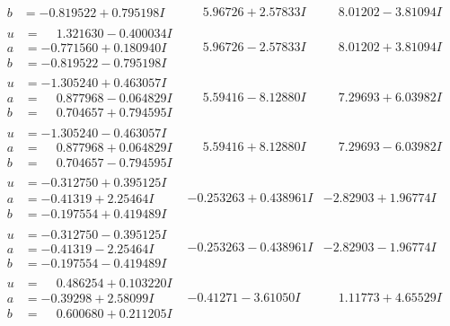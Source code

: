 \documentclass[1p]{elsarticle_modified}
\theoremstyle{definition}
\begin{document}
$$\begin{array}{c|c|c}
\begin{aligned}
b &= -0.819522 + 0.795198 I\end{aligned}
 & \phantom{-}5.96726 + 2.57833 I & \phantom{-}8.01202 - 3.81094 I \\ \hline\begin{aligned}
u &= \phantom{-}1.321630 - 0.400034 I \\
a &= -0.771560 + 0.180940 I \\
b &= -0.819522 - 0.795198 I\end{aligned}
 & \phantom{-}5.96726 - 2.57833 I & \phantom{-}8.01202 + 3.81094 I \\ \hline\begin{aligned}
u &= -1.305240 + 0.463057 I \\
a &= \phantom{-}0.877968 - 0.064829 I \\
b &= \phantom{-}0.704657 + 0.794595 I\end{aligned}
 & \phantom{-}5.59416 - 8.12880 I & \phantom{-}7.29693 + 6.03982 I \\ \hline\begin{aligned}
u &= -1.305240 - 0.463057 I \\
a &= \phantom{-}0.877968 + 0.064829 I \\
b &= \phantom{-}0.704657 - 0.794595 I\end{aligned}
 & \phantom{-}5.59416 + 8.12880 I & \phantom{-}7.29693 - 6.03982 I \\ \hline\begin{aligned}
u &= -0.312750 + 0.395125 I \\
a &= -0.41319 + 2.25464 I \\
b &= -0.197554 + 0.419489 I\end{aligned}
 & -0.253263 + 0.438961 I & -2.82903 + 1.96774 I \\ \hline\begin{aligned}
u &= -0.312750 - 0.395125 I \\
a &= -0.41319 - 2.25464 I \\
b &= -0.197554 - 0.419489 I\end{aligned}
 & -0.253263 - 0.438961 I & -2.82903 - 1.96774 I \\ \hline\begin{aligned}
u &= \phantom{-}0.486254 + 0.103220 I \\
a &= -0.39298 + 2.58099 I \\
b &= \phantom{-}0.600680 + 0.211205 I\end{aligned}
 & -0.41271 - 3.61050 I & \phantom{-}1.11773 + 4.65529 I \\ \hline\begin{aligned}

\end{aligned}
\end{array}$$
\end{document}
